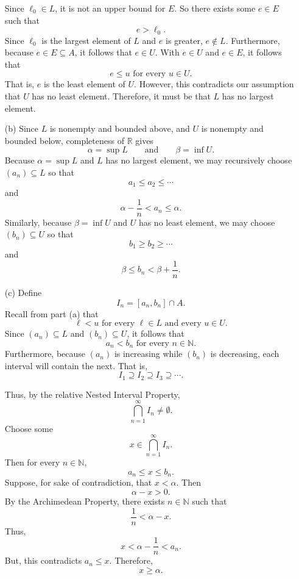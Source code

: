 \documentclass[12pt]{article}
\begin{document}
\begin{enumerate}
            Since $\ell_0 \in L$, it is not an upper bound for $E$.
            So there exists some $e \in E$ such that
            \[
                  e > \ell_0.
            \]
            Since $\ell_0$ is the largest element of $L$ and $e$ is greater, $e \notin L$.
            Furthermore, because $e \in E \subseteq A$, it follows that $e \in U$.
            With $e \in U$ and $e \in E$, it follows that
            \[
                  e \leq u \text{ for every } u \in U.
            \]
            That is, $e$ is the least element of $U$.
            However, this contradicts our assumption that $U$ has no least element.
            Therefore, it must be that $L$ has no largest element.
      \item [(b)]
            Since $L$ is nonempty and bounded above, and $U$ is nonempty and bounded below,
            completeness of $\mathbb{R}$ gives
            \[
                  \alpha = \sup L
                  \qquad \text{and} \qquad
                  \beta = \inf U.
            \]
            Because $\alpha = \sup L$ and $L$ has no largest element, we may
            recursively choose $(a_n) \subseteq L$ so that
            \[
                  a_1 \leq a_2 \leq \cdots
            \]
            and
            \[
                  \alpha-\frac{1}{n}<a_n\leq\alpha.
            \]
            Similarly, because $\beta=\inf U$ and $U$ has no least element, we may
            choose $(b_n)\subseteq U$ so that
            \[
                  b_1\geq b_2\geq\cdots
            \]
            and
            \[
                  \beta\leq b_n<\beta+\frac{1}{n}.
            \]
      \item [(c)]
            Define
            \[
                  I_n = [a_n, b_n] \cap A.
            \]
            Recall from part (a) that
            \[
                  \ell < u \text{ for every } \ell \in L \text{ and every } u \in U.
            \]
            Since $(a_n) \subseteq L$ and $(b_n) \subseteq U$, it follows that
            \[
                  a_n < b_n \text{ for every } n \in \mathbb{N}.
            \]
            Furthermore, because $(a_n)$ is increasing while $(b_n)$ is decreasing, each interval will contain the next.
            That is,
            \[
                  I_1 \supseteq I_2 \supseteq I_3 \supseteq \cdots.
            \]

            Thus, by the relative Nested Interval Property,
            \[
                  \bigcap_{n=1}^{\infty} I_n \neq \emptyset.
            \]
            Choose some
            \[
                  x \in \bigcap_{n=1}^{\infty} I_n.
            \]
            Then for every $n \in \mathbb{N}$,
            \[
                  a_n \leq x \leq b_n.
            \]
            Suppose, for sake of contradiction, that $x < \alpha$. Then
            \[
                  \alpha - x > 0.
            \]
            By the Archimedean Property, there exists $n \in \mathbb{N}$ such that
            \[
                  \frac{1}{n} < \alpha - x.
            \]
            Thus,
            \[
                  x < \alpha - \frac{1}{n} < a_n.
            \]
            But, this contradicts $a_n \leq x$.
            Therefore,
            \[
                  x \geq \alpha.
            \]


\end{enumerate}
\end{document}
